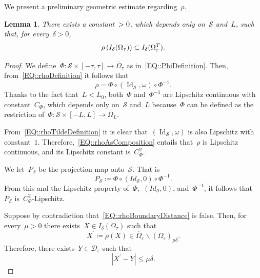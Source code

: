 \documentclass[12pt,a4paper]{amsart}
\makeatletter
\numberwithin{equation}{section}
\newtheorem{lemma}[theorem]{Lemma}
\theoremstyle{definition}
\theoremstyle{remark}
\newcommand{\eps}{\varepsilon}
\newcommand{\abs}[1]{\left\lvert#1\right\rvert}
\renewcommand{\leq}{\leqslant}
\newcommand{\const}[1]{%
  \csname const@#1\endcsname%
}
\makeatother
\begin{document}
We present a preliminary geometric estimate regarding~$\rho$.
\begin{lemma}
    There exists a constant~$\const{CONST::rhoBoundaryDistance}>0$, which depends only on~$\mathcal{S}$ and~$L$, such that, for every~${\delta > 0}$,
    \begin{equation}\label{EQ::rhoBoundaryDistance}
        \rho\left(I_\delta(\Omega_\tau)\right) \subset I_{\const{CONST::rhoBoundaryDistance}\delta}(\Omega_\eps^T).
    \end{equation}
\end{lemma}
\begin{proof}
    We define~$\Phi \colon \mathcal{S} \times [-\tau, \tau] \to \overline{\Omega}_\tau$ as in~\eqref{EQ::PhiDefinition}. Then, from~\eqref{EQ::rhoDefinition} it follows that
    \begin{equation}\label{EQ::rhoAsComposition}
        \rho = \Phi \circ (\operatorname{Id}_\mathcal{S},\omega) \circ \Phi^{-1}.
    \end{equation}
    Thanks to the fact that~$L<L_0$, both~$\Phi$ and~$\Phi^{-1}$ are Lipschitz continuous with constant~$C_\Phi$, which depends only on~$\mathcal{S}$ and~$L$ because~$\Phi$ can be defined as the restriction of~$\Phi \colon \mathcal{S} \times [-L, L] \to \overline{\Omega}_L$.
    
    From~\eqref{EQ::rhoTildeDefinition} it is clear that~$(\operatorname{Id}_\mathcal{S},\omega)$ is also Lipschitz with constant~$1$. Therefore,~\eqref{EQ::rhoAsComposition} entails that~$\rho$ is Lipschitz continuous, and its Lipschitz constant is~$C_\Phi^2$.

    We let~$P_\mathcal{S}$ be the projection map onto~$\mathcal{S}$. That is
    \begin{equation}
        P_\mathcal{S} \coloneq \Phi \circ (Id_\mathcal{S}, 0) \circ \Phi^{-1}.
    \end{equation}
    From this and the Lipschitz property of~$\Phi$,~$(Id_\mathcal{S}, 0)$, and~$\Phi^{-1}$, it follows that~$P_\mathcal{S}$ is~$C_\Phi^2$-Lipschitz.

    Suppose by contradiction that~\eqref{EQ::rhoBoundaryDistance} is false. Then, for every~$\mu > 0$ there exists~$X \in I_\delta(\Omega_\tau)$ such that
    \begin{equation}
        X^\prime \coloneq \rho(X) \in \overline{\Omega}_\eps \smallsetminus {\left(\Omega_\eps\right)}_{\mu \delta}.
    \end{equation}
    Therefore, there exists~$Y \in \mathcal{D}_\eps$ such that
    \begin{equation}\label{EQ::XprimeYnear}
        \abs{X^\prime - Y} \leq \mu \delta.
    \end{equation}


\end{proof}
\end{document}
